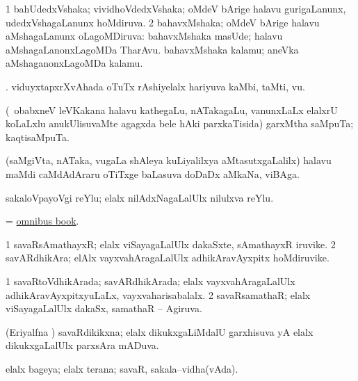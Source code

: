 \bentry
{}
\gl{\gu}
\bmng
\bnum
\num{1} bahUdedxVshaka; vividhoVdedxVshaka; oMdeV bArige halavu gurigaLanunx, udedxVshagaLanunx hoMdiruva. 
\num{2} bahavxMshaka; oMdeV bArige halavu aMshagaLanunx oLagoMDiruva:  bahavxMshaka masUde; halavu aMshagaLanonxLagoMDa TharAvu.  bahavxMshaka kalamu; aneVka aMshaganonxLagoMDa kalamu. 
\enum
\emng

\noindent
\gl{\pagu}
\bmng
{}. viduyxtapxrXvAhada oTuTx rAshiyelalx hariyuva kaMbi, taMti, \mo vu. 
\emng
\eentry

\bentry
{}
\gl{\nA }
\bmng
(\sA\ obabxneV leVKakana halavu kathegaLu, nATakagaLu, \mo vanunxLaLx elalxrU koLaLxlu anukUlisuvaMte agagxda bele hAki parxkaTisida) garxMtha saMpuTa; kaqtisaMpuTa. 
\emng
\eentry

\bentry
{}
\gl{\nA}
\bmng
(saMgiVta, nATaka, \mo vugaLa shAleya kuLiyalilxya aMtasutxgaLalilx) halavu maMdi caMdAdAraru oTiTxge baLasuva doDaDx aMkaNa, viBAga. 
\emng
\eentry

\bentry
{}
\gl{\nA}
\bmng
sakaloVpayoVgi reYlu; elalx nilAdxNagaLalUlx nilulxva reYlu. 
\emng
\eentry

\bentry
{}
\gl{\nA}
\bmng
= \hyperlink{omnibus book}{omnibus book}. 
\emng
\eentry

\bentry
{}
\gl{\nA}
\bmng
\bnum
\num{1} savaRsAmathayxR; elalx viSayagaLalUlx dakaSxte, sAmathayxR iruvike. 
\num{2} savARdhikAra; elAlx vayxvahAragaLalUlx adhikAravAyxpitx hoMdiruvike. 
\enum
\emng
\eentry

\bentry
{}
\gl{\gu}
\bmng
\bnum
\num{1} savaRtoVdhikArada; savARdhikArada; elalx vayxvahAragaLalUlx adhikAravAyxpitxyuLaLx, vayxvaharisabalalx. 
\num{2} savaRsamathaR; elalx viSayagaLalUlx dakaSx, samathaR -- Agiruva. 
\enum
\emng
\eentry

\bentry
{}
\gl{\gu}
\bmng
(Eriyalfna \vi) savaRdikikxna; elalx dikukxgaLiMdalU garxhisuva yA elalx dikukxgaLalUlx parxsAra mADuva. 
\emng
\eentry

\bentry
{}
\gl{\gu}
\bmng
elalx bageya; elalx terana; savaR, sakala--vidha(vAda). 
\emng
\eentry

